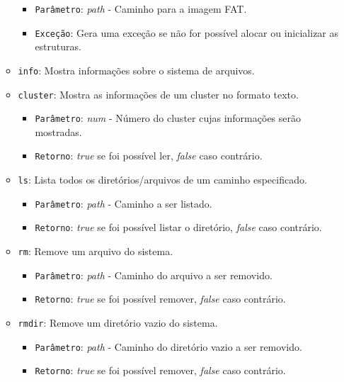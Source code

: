 \documentclass[
    12pt,				%
    oneside,   	        %
    a4paper,			%
    english,			%
    french,				%
    spanish,			%
    brazil,				%
    ]{pacotes/abntex2}
\begin{document}
\begin{itemize}
\begin{itemize}
            \begin{itemize}
                \item \texttt{Parâmetro}: \textit{path} - Caminho para a imagem FAT.
                \item \texttt{Exceção}: Gera uma exceção se não for possível alocar ou inicializar as estruturas.
            \end{itemize}
            \item \texttt{info}: Mostra informações sobre o sistema de arquivos.
            \item \texttt{cluster}: Mostra as informações de um cluster no formato texto.
            \begin{itemize}
                \item \texttt{Parâmetro}: \textit{num} - Número do cluster cujas informações serão mostradas.
                \item \texttt{Retorno}: \textit{true} se foi possível ler, \textit{false} caso contrário.
            \end{itemize}
            \item \texttt{ls}: Lista todos os diretórios/arquivos de um caminho especificado.
            \begin{itemize}
                \item \texttt{Parâmetro}: \textit{path} - Caminho a ser listado.
                \item \texttt{Retorno}: \textit{true} se foi possível listar o diretório, \textit{false} caso contrário.
            \end{itemize}
            \item \texttt{rm}: Remove um arquivo do sistema.
            \begin{itemize}
                \item \texttt{Parâmetro}: \textit{path} - Caminho do arquivo a ser removido.
                \item \texttt{Retorno}: \textit{true} se foi possível remover, \textit{false} caso contrário.
            \end{itemize}
            \item \texttt{rmdir}: Remove um diretório vazio do sistema.
            \begin{itemize}
                \item \texttt{Parâmetro}: \textit{path} - Caminho do diretório vazio a ser removido.
                \item \texttt{Retorno}: \textit{true} se foi possível remover, \textit{false} caso contrário.

\end{itemize}
\end{itemize}
\end{itemize}
\end{document}
